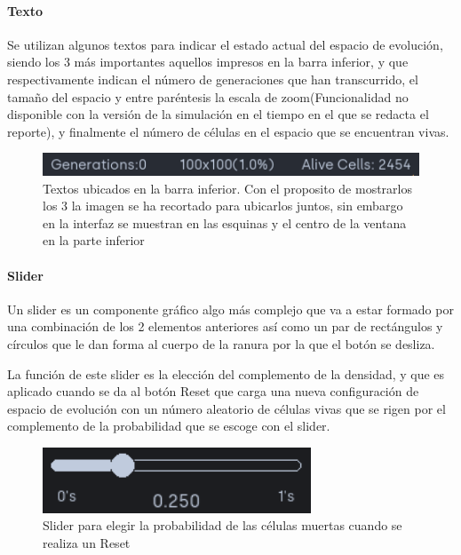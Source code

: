 \documentclass[]{article}
\begin{document}
			\paragraph{Texto}
				Se utilizan algunos textos para indicar el estado actual del espacio de evolución, siendo los 3 más importantes aquellos impresos en la barra inferior, y que respectivamente indican el número de generaciones que han transcurrido, el tamaño del espacio y entre paréntesis la escala de zoom(Funcionalidad no disponible con la versión de la simulación en el tiempo en el que se redacta el reporte), y finalmente el número de células en el espacio que se encuentran vivas.
				
				\begin{figure}[!h]
					\centering
					\includegraphics[width=12cm]{Imagenes/textos_seccion_inferior.png}
					\caption{Textos ubicados en la barra inferior. Con el proposito de mostrarlos los 3 la imagen se ha recortado para ubicarlos juntos, sin embargo en la interfaz se muestran en las esquinas y el centro de la ventana en la parte inferior}
				\end{figure}
			
			\paragraph{Slider}
				Un slider es un componente gráfico algo más complejo que va a estar formado por una combinación de los 2 elementos anteriores así como un par de rectángulos y círculos que le dan forma al cuerpo de la ranura por la que el botón se desliza.
				
				La función de este slider es la elección del complemento de la densidad, y que es aplicado cuando se da al botón Reset que carga una nueva configuración de espacio de evolución con un número aleatorio de células vivas que se rigen por el complemento de la probabilidad que se escoge con el slider.
				
				\begin{figure}[!h]
					\centering
					\includegraphics[width=8cm]{Imagenes/slider.png}
					\caption{Slider para elegir la probabilidad de las células muertas cuando se realiza un Reset}
					\label{Slider}
				\end{figure}
			
\end{document}
